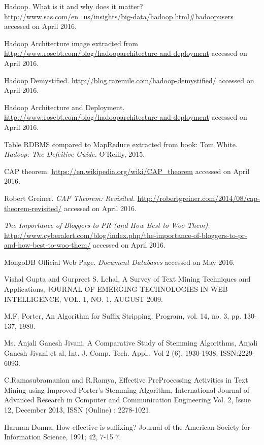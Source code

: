 \begin{thebibliography}{99999}
 Hadoop. What is it and why does it matter? \url{http://www.sas.com/en_us/insights/big-data/hadoop.html#hadoopusers} accessed on April 2016.

 Hadoop Architecture image extracted from \url{http://www.rosebt.com/blog/hadooparchitecture-and-deployment} accessed on April 2016.

 Hadoop Demystified. \url{http://blog.raremile.com/hadoop-demystified/} accessed on April 2016.

 Hadoop Architecture and Deployment. \url{http://www.rosebt.com/blog/hadooparchitecture-and-deployment} accessed on April 2016.

 Table RDBMS compared to MapReduce extracted from book: Tom White. \textit{Hadoop: The Defeitive Guide.} O'Reilly, 2015.

 CAP theorem. \url{https://en.wikipedia.org/wiki/CAP_theorem} accessed on April 2016.

 Robert Greiner. \textit{CAP Theorem: Revisited.} \url{http://robertgreiner.com/2014/08/cap-theorem-revisited/} accessed on April 2016.

\textit{The Importance of Bloggers to PR (and How Best to Woo Them).} \url{http://www.cyberalert.com/blog/index.php/the-importance-of-bloggers-to-pr-and-how-best-to-woo-them/} accessed on April 2016.

 MongoDB Official Web Page. \textit{Document Databases} accessed on May 2016.

 Vishal Gupta and Gurpreet S. Lehal, A Survey of Text Mining Techniques and Applications, JOURNAL OF EMERGING TECHNOLOGIES IN WEB INTELLIGENCE, VOL. 1, NO. 1, AUGUST 2009. 

  M.F. Porter, An Algorithm for Suffix Stripping, Program, vol. 14, no. 3, pp. 130-137, 1980.

 Ms. Anjali Ganesh Jivani, A Comparative Study of Stemming Algorithms, Anjali Ganesh Jivani et al, Int. J. Comp. Tech. Appl., Vol 2 (6), 1930-1938, ISSN:2229-6093.

 C.Ramasubramanian and R.Ramya, Effective PreProcessing Activities in Text Mining using Improved Porter's Stemming Algorithm, International Journal of Advanced Research in Computer and Communication Engineering Vol. 2, Issue 12, December 2013, ISSN (Online) : 2278-1021. 

 Harman Donna, How effective is suffixing?
Journal of the American Society for Information Science, 1991; 42, 7-15 7.


\end{thebibliography}
